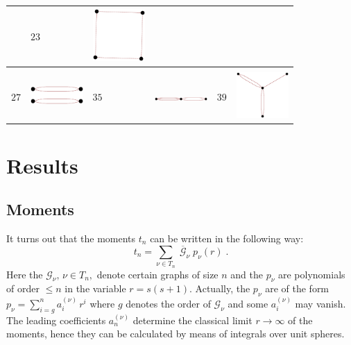 \documentclass[aps,twocolumn,groupedaddress]{revtex4}
\begin{document}
\begin{table}[ht]
\begin{center}
\begin{tabular}{||l|l||l|l||l|l||}
 &$23$  &\includegraphics[width=2cm]{G23}    \\
\hline\\
$27$  &\includegraphics[width=2cm]{G27}& $35$
&\includegraphics[width=2cm]{G35}
 &  $39$  &\includegraphics[width=2cm]{G39}   \\
\hline
\end{tabular}
\end{center}
\end{table}






\section{Results}\label{sec:R}
\subsection{Moments}\label{sec:R_mom}
It turns out that the moments $t_n$ can be written in the following
way:
\begin{equation}\label{r1}
t_n=\sum_{\nu\in T_n}\;\overline{\mathcal G}_\nu\; p_\nu(r) \;.
\end{equation}
Here the ${\mathcal G}_\nu,\,\nu\in T_n,$ denote certain graphs of
size $n$ and the $p_\nu$ are polynomials of order $\le n$ in the
variable $r=s(s+1)$. Actually, the $p_\nu$ are of the form
$p_\nu=\sum_{i=g}^n a^{(\nu)}_i\,r^i$ where $g$ denotes the order of
${\mathcal G}_\nu$ and some $a^{(\nu)}_i$ may vanish. The leading
coefficients $a^{(\nu)}_n$ determine the classical limit
$r\longrightarrow \infty$ of the moments, hence they can be
calculated by means of integrals
over unit spheres.\\
\end{document}
